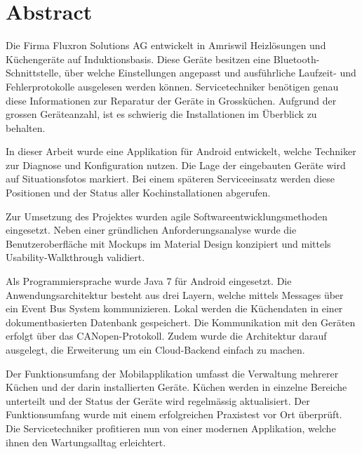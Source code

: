 
\chapter*{Abstract}
Die Firma Fluxron Solutions AG entwickelt in Amriswil Heizlösungen und Küchengeräte auf Induktionsbasis. Diese Geräte besitzen eine Bluetooth-Schnittstelle, über welche Einstellungen angepasst und ausführliche Laufzeit- und Fehlerprotokolle ausgelesen werden können. Servicetechniker benötigen genau diese Informationen zur Reparatur der Geräte in Grossküchen. Aufgrund der grossen Geräteanzahl, ist es schwierig die Installationen im Überblick zu behalten.

In dieser Arbeit wurde eine Applikation für Android entwickelt, welche Techniker zur Diagnose und Konfiguration nutzen. Die Lage der eingebauten Geräte wird auf Situationsfotos markiert. Bei einem späteren Serviceeinsatz werden diese Positionen und der Status aller Kochinstallationen abgerufen.

Zur Umsetzung des Projektes wurden agile Softwareentwicklungsmethoden eingesetzt. Neben einer gründlichen Anforderungsanalyse wurde die Benutzeroberfläche mit Mockups im Material Design konzipiert und mittels Usability-Walkthrough validiert.

Als Programmiersprache wurde Java 7 für Android eingesetzt. Die Anwendungsarchitektur besteht aus drei Layern, welche mittels Messages über ein Event Bus System kommunizieren. Lokal werden die Küchendaten in einer dokumentbasierten Datenbank gespeichert. Die Kommunikation mit den Geräten erfolgt über das CANopen-Protokoll. Zudem wurde die Architektur darauf ausgelegt, die Erweiterung um ein Cloud-Backend einfach zu machen.

Der Funktionsumfang der Mobilapplikation umfasst die Verwaltung mehrerer Küchen und der darin installierten Geräte. Küchen werden in einzelne Bereiche unterteilt und der Status der Geräte wird regelmässig aktualisiert. Der Funktionsumfang wurde mit einem erfolgreichen Praxistest vor Ort überprüft. Die Servicetechniker profitieren nun von einer modernen Applikation, welche ihnen den Wartungsalltag erleichtert.